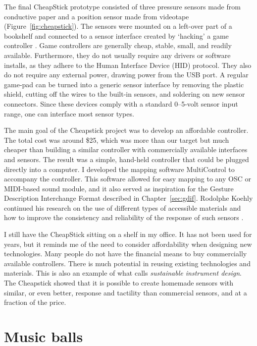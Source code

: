 The final CheapStick prototype consisted of three pressure sensors made from conductive paper and a position sensor made from videotape (Figure~\ref{fig:cheapstick}). The sensors were mounted on a left-over part of a bookshelf and connected to a sensor interface created by `hacking' a game controller \citep[p.195-200]{collins_handmade_2006}. Game controllers are generally cheap, stable, small, and readily available. Furthermore, they do not usually require any drivers or software installs, as they adhere to the Human Interface Device (HID) protocol. They also do not require any external power, drawing power from the USB port. A regular game-pad can be turned into a generic sensor interface by removing the plastic shield, cutting off the wires to the built-in sensors, and soldering on new sensor connectors. Since these devices comply with a standard 0--5-volt sensor input range, one can interface most sensor types.

The main goal of the Cheapstick project was to develop an affordable controller. The total cost was around \${25}, which was more than our target but much cheaper than building a similar controller with commercially available interfaces and sensors. The result was a simple, hand-held controller that could be plugged directly into a computer. I developed the mapping software MultiControl to accompany the controller. This software allowed for easy mapping to any OSC or MIDI-based sound module, and it also served as inspiration for the Gesture Description Interchange Format described in Chapter~\ref{sec:gdif}. Rodolphe Koehly continued his research on the use of different types of accessible materials and how to improve the consistency and reliability of the response of such sensors \citep{koehly_fabrication_2011}.

I still have the CheapStick sitting on a shelf in my office. It has not been used for years, but it reminds me of the need to consider affordability when designing new technologies. Many people do not have the financial means to buy commercially available controllers. There is much potential in reusing existing technologies and materials. This is also an example of what \citet{freed_fingerphone_2012} calls \emph{sustainable instrument design}. The Cheapstick showed that it is possible to create homemade sensors with similar, or even better, response and tactility than commercial sensors, and at a fraction of the price.


\section{Music balls}\label{sec:music-balls}

